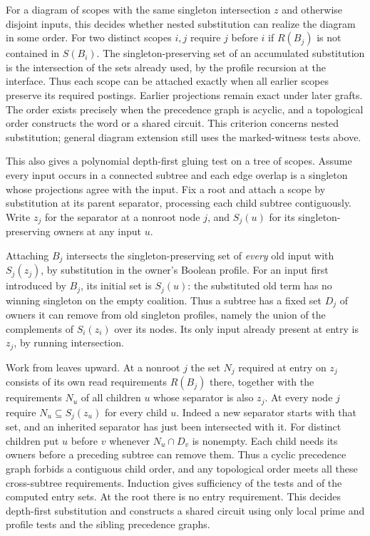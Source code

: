 For a diagram of scopes with the same singleton
intersection $z$ and otherwise disjoint inputs,
this decides whether nested substitution can
realize the diagram in some order. For two
distinct scopes $i,j$ require $j$ before $i$
if $R(B_j)$ is not contained in $S(B_i)$.
The singleton-preserving set of an accumulated
substitution is the intersection of the sets
already used, by the profile recursion at
the interface. Thus each scope can be attached
exactly when all earlier scopes preserve its
required postings. Earlier projections remain
exact under later grafts. The order exists
precisely when the precedence graph is acyclic,
and a topological order constructs the word
or a shared circuit. This criterion concerns
nested substitution; general diagram extension
still uses the marked-witness tests above.

This also gives a polynomial depth-first gluing test
on a tree of scopes. Assume every input occurs in a
connected subtree and each edge overlap is a
singleton whose projections agree with the input.
Fix a root and attach a scope by substitution at
its parent separator, processing each child
subtree contiguously. Write $z_j$ for the separator
at a nonroot node $j$, and $S_j(u)$ for its
singleton-preserving owners at any input $u$.

Attaching $B_j$ intersects the singleton-preserving
set of \emph{every} old input with $S_j(z_j)$,
by substitution in the owner's Boolean profile.
For an input first introduced by $B_j$, its initial
set is $S_j(u)$: the substituted old term has no
winning singleton on the empty coalition. Thus a
subtree has a fixed set $D_j$ of owners it can
remove from old singleton profiles, namely the
union of the complements of $S_i(z_i)$ over its
nodes. Its only input already present at entry
is $z_j$, by running intersection.

Work from leaves upward. At a nonroot $j$ the
set $N_j$ required at entry on $z_j$ consists
of its own read requirements $R(B_j)$ there,
together with the requirements $N_u$ of all
children $u$ whose separator is also $z_j$.
At every node $j$ require
$N_u\subseteq S_j(z_u)$ for every child $u$.
Indeed a new separator starts with that set,
and an inherited separator has just been
intersected with it. For distinct children put
$u$ before $v$ whenever $N_u\cap D_v$ is
nonempty. Each child needs its owners before
a preceding subtree can remove them. Thus a
cyclic precedence graph forbids a contiguous
child order, and any topological order meets
all these cross-subtree requirements. Induction
gives sufficiency of the tests and of the
computed entry sets. At the root there is no
entry requirement. This decides depth-first
substitution and constructs a shared circuit
using only local prime and profile tests and
the sibling precedence graphs.

